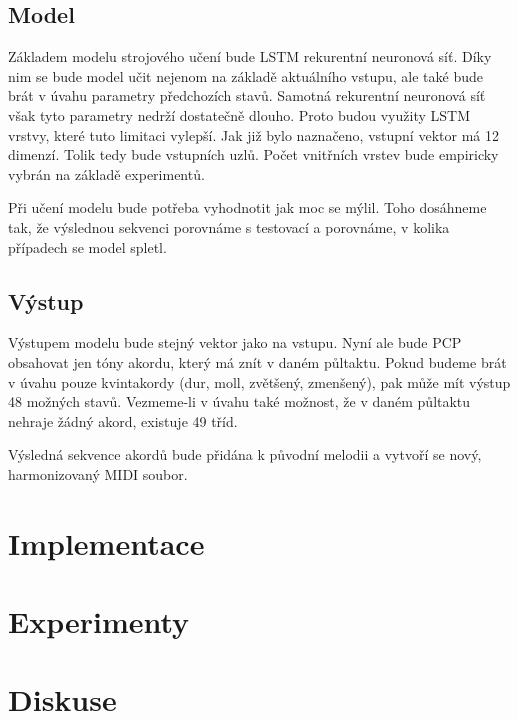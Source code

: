 \section{Model}
Základem modelu strojového učení bude LSTM rekurentní neuronová síť.
Díky nim se bude model učit nejenom na základě aktuálního vstupu,
ale také bude brát v úvahu parametry předchozích stavů.
Samotná rekurentní neuronová síť však tyto parametry nedrží dostatečně dlouho.
Proto budou využity LSTM vrstvy, 
které tuto limitaci vylepší.
Jak již bylo naznačeno, 
vstupní vektor má 12 dimenzí.
Tolik tedy bude vstupních uzlů.
Počet vnitřních vrstev bude empiricky vybrán na základě experimentů.
\par
Při učení modelu bude potřeba vyhodnotit jak moc se mýlil.
Toho dosáhneme tak, že výslednou sekvenci porovnáme s
testovací a porovnáme, v kolika případech se model spletl.

\section{Výstup}
Výstupem modelu bude stejný vektor jako na vstupu.
Nyní ale bude PCP obsahovat jen tóny akordu, 
který má znít v daném půltaktu.
Pokud budeme brát v úvahu pouze kvintakordy (dur, moll, zvětšený, zmenšený),
pak může mít výstup 48 možných stavů.
Vezmeme-li v úvahu také možnost, že v daném půltaktu nehraje žádný akord,
existuje 49 tříd.
\par
Výsledná sekvence akordů bude přidána k původní melodii
a vytvoří se nový, harmonizovaný MIDI soubor.




\chapter{Implementace}

\chapter{Experimenty}

\chapter{Diskuse}

